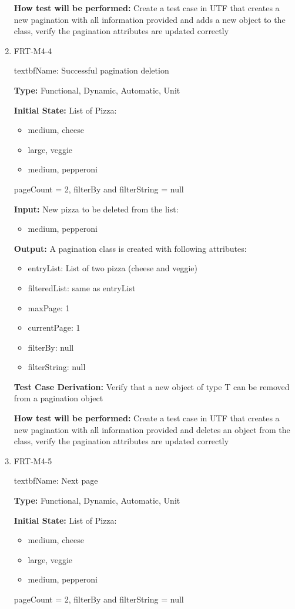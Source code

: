 \documentclass[12pt, titlepage]{article}
\begin{document}
\begin{enumerate}
\textbf{How test will be performed:} Create a test case in UTF that creates a new pagination with all information provided and adds a new object to the class, verify the pagination attributes are updated correctly

\item{FRT-M4-4}

textbf{Name:} Successful pagination deletion 

\textbf{Type:} Functional, Dynamic, Automatic, Unit
					
\textbf{Initial State:} List of Pizza:
\begin{itemize}
\item medium, cheese
\item large, veggie
\item medium, pepperoni
\end{itemize}
pageCount = 2, filterBy and filterString = null
					
\textbf{Input:} New pizza to be deleted from the list:
\begin{itemize}
\item medium, pepperoni
\end{itemize}
					
\textbf{Output:} A pagination class is created with following attributes:
\begin{itemize}
\item entryList: List of two pizza (cheese and veggie)
\item filteredList: same as entryList
\item maxPage: 1
\item currentPage: 1
\item filterBy: null
\item filterString: null
\end{itemize}

\textbf{Test Case Derivation:} Verify that a new object of type T can be removed from a pagination object

\textbf{How test will be performed:} Create a test case in UTF that creates a new pagination with all information provided and deletes an object from the class, verify the pagination attributes are updated correctly

\item{FRT-M4-5}

textbf{Name:} Next page

\textbf{Type:} Functional, Dynamic, Automatic, Unit
					
\textbf{Initial State:} List of Pizza:
\begin{itemize}
\item medium, cheese
\item large, veggie
\item medium, pepperoni
\end{itemize}
pageCount = 2, filterBy and filterString = null
					

\end{enumerate}
\end{document}
